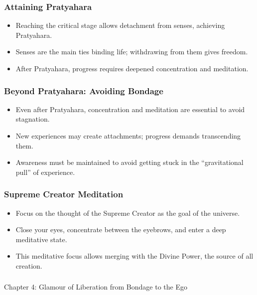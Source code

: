 \begin{frame}[fragile]\frametitle{Attaining Pratyahara}
    \begin{itemize}
        \item Reaching the critical stage allows detachment from senses, achieving Pratyahara.
        \item Senses are the main ties binding life; withdrawing from them gives freedom.
        \item After Pratyahara, progress requires deepened concentration and meditation.
    \end{itemize}
\end{frame}

\begin{frame}[fragile]\frametitle{Beyond Pratyahara: Avoiding Bondage}
    \begin{itemize}
        \item Even after Pratyahara, concentration and meditation are essential to avoid stagnation.
        \item New experiences may create attachments; progress demands transcending them.
        \item Awareness must be maintained to avoid getting stuck in the “gravitational pull” of experience.
    \end{itemize}
\end{frame}

\begin{frame}[fragile]\frametitle{Supreme Creator Meditation}
    \begin{itemize}
        \item Focus on the thought of the Supreme Creator as the goal of the universe.
        \item Close your eyes, concentrate between the eyebrows, and enter a deep meditative state.
        \item This meditative focus allows merging with the Divine Power, the source of all creation.
    \end{itemize}
\end{frame}


\begin{frame}[fragile]\frametitle{}
\begin{center}
{\Large Chapter 4: Glamour of Liberation from Bondage to the Ego }
\end{center}
\end{frame}

